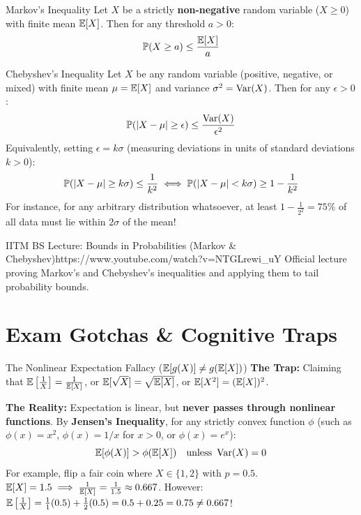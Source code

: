 \begin{theorembox}{Markov's Inequality}
Let $X$ be a strictly \textbf{non-negative} random variable ($X \ge 0$) with finite mean $\E[X]$. Then for any threshold $a > 0$:
$$\P(X \ge a) \le \frac{\E[X]}{a}$$
\end{theorembox}

\begin{theorembox}{Chebyshev's Inequality}
Let $X$ be any random variable (positive, negative, or mixed) with finite mean $\mu = \E[X]$ and variance $\sigma^2 = \Var(X)$. Then for any $\epsilon > 0$:
$$\P(|X - \mu| \ge \epsilon) \le \frac{\Var(X)}{\epsilon^2}$$
Equivalently, setting $\epsilon = k\sigma$ (measuring deviations in units of standard deviations $k > 0$):
$$\P(|X - \mu| \ge k\sigma) \le \frac{1}{k^2} \iff \P(|X - \mu| < k\sigma) \ge 1 - \frac{1}{k^2}$$
For instance, for any arbitrary distribution whatsoever, at least $1 - \frac{1}{2^2} = 75\%$ of all data must lie within $2\sigma$ of the mean!
\end{theorembox}

\begin{videocard}{IITM BS Lecture: Bounds in Probabilities (Markov \& Chebyshev)}{https://www.youtube.com/watch?v=NTGLrewi_uY}
Official lecture proving Markov's and Chebyshev's inequalities and applying them to tail probability bounds.
\end{videocard}

\section{Exam Gotchas \& Cognitive Traps}

\begin{trapbox}{The Nonlinear Expectation Fallacy ($\E[g(X)] \neq g(\E[X])$)}
\textbf{The Trap:} Claiming that $\E\left[\frac{1}{X}\right] = \frac{1}{\E[X]}$, or $\E[\sqrt{X}] = \sqrt{\E[X]}$, or $\E[X^2] = (\E[X])^2$.

\textbf{The Reality:} Expectation is linear, but \textbf{never passes through nonlinear functions}. 
By \textbf{Jensen's Inequality}, for any strictly convex function $\phi$ (such as $\phi(x) = x^2$, $\phi(x) = 1/x$ for $x>0$, or $\phi(x) = e^x$):
$$\E[\phi(X)] > \phi(\E[X]) \quad \text{unless } \Var(X) = 0$$
For example, flip a fair coin where $X \in \{1, 2\}$ with $p=0.5$.
$\E[X] = 1.5 \implies \frac{1}{\E[X]} = \frac{1}{1.5} \approx 0.667$.
However: $\E\left[\frac{1}{X}\right] = \frac{1}{1}(0.5) + \frac{1}{2}(0.5) = 0.5 + 0.25 = 0.75 \neq 0.667$!
\end{trapbox}

